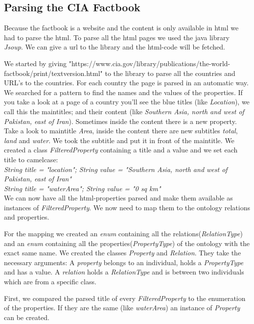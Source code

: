 \documentclass{article}
\begin{document}
\subsection{Parsing the CIA Factbook}
\label{sec:factbook}
Because the factbook is a website and the content is only available in html we had to parse the html.
To parse all the html pages we used the java library \textit{Jsoup}\cite{jsoup}. We can give a url to the library and the html-code will be fetched.
\par
We started by giving "https://www.cia.gov/library/publications/the-world-factbook/print/textversion.html" to the library to parse all the countries and URL's to the countries.
For each country the page is parsed in an automatic way. We searched for a pattern to find the names and the values of the properties.
If you take a look at a page of a country you'll see the blue titles (like \textit{Location}), we call this the maintitles; and their content (like \textit{Southern Asia, north and west of Pakistan, east of Iran}).
Sometimes inside the content there is a new property. Take a look to maintitle \textit{Area}, inside the content there are new subtitles \textit{total}, \textit{land} and \textit{water}. We took the subtitle and put it in front of the maintitle.
We created a class \textit{FilteredProperty} containing a title and a value and we set each title to camelcase:
\\\textit{String title = "location"; String value = "Southern Asia, north and west of Pakistan, east of Iran"}
\\\textit{String title = "waterArea"; String value = "0 sq km"}
\\We can now have all the html-properties parsed and make them available as instances of \textit{FilteredProperty}. We now need to map them to the ontology relations and properties.
\par
For the mapping we created an \textit{enum} containing all the relations(\textit{RelationType}) and an \textit{enum} containing all the properties(\textit{PropertyType}) of the ontology with the exact same name. We created the classes \textit{Property} and \textit{Relation}.
They take the necessary arguments: A \textit{property} belongs to an individual, holds a \textit{PropertyType} and has a value.
A \textit{relation} holds a \textit{RelationType} and is between two individuals which are from a specific class.
\par
First, we compared the parsed title of every \textit{FilteredProperty} to the enumeration of the properties. If they are the same (like \textit{waterArea}) an instance of \textit{Property} can be created.
\end{document}

